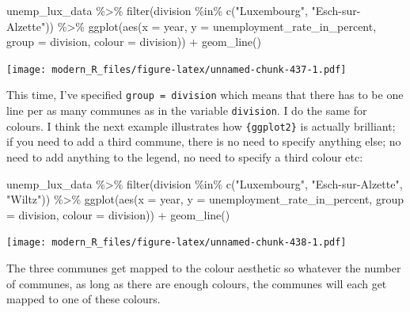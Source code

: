 \documentclass[
]{article}
\newenvironment{Shaded}{\begin{snugshade}}{\end{snugshade}}
\newcommand{\AttributeTok}[1]{\textcolor[rgb]{0.77,0.63,0.00}{#1}}
\newcommand{\FunctionTok}[1]{\textcolor[rgb]{0.00,0.00,0.00}{#1}}
\newcommand{\NormalTok}[1]{#1}
\newcommand{\SpecialCharTok}[1]{\textcolor[rgb]{0.00,0.00,0.00}{#1}}
\newcommand{\StringTok}[1]{\textcolor[rgb]{0.31,0.60,0.02}{#1}}
\begin{document}
\begin{Shaded}
\begin{Highlighting}[]
\NormalTok{unemp\_lux\_data }\SpecialCharTok{\%\textgreater{}\%}
  \FunctionTok{filter}\NormalTok{(division }\SpecialCharTok{\%in\%} \FunctionTok{c}\NormalTok{(}\StringTok{"Luxembourg"}\NormalTok{, }\StringTok{"Esch{-}sur{-}Alzette"}\NormalTok{)) }\SpecialCharTok{\%\textgreater{}\%}
  \FunctionTok{ggplot}\NormalTok{(}\FunctionTok{aes}\NormalTok{(}\AttributeTok{x =}\NormalTok{ year, }\AttributeTok{y =}\NormalTok{ unemployment\_rate\_in\_percent, }\AttributeTok{group =}\NormalTok{ division, }\AttributeTok{colour =}\NormalTok{ division)) }\SpecialCharTok{+}
  \FunctionTok{geom\_line}\NormalTok{()}
\end{Highlighting}
\end{Shaded}

\texttt{[image: modern\_R\_files/figure-latex/unnamed-chunk-437-1.pdf]}

This time, I've specified \texttt{group\ =\ division} which means that there has to be one line per as many
communes as in the variable \texttt{division}. I do the same for colours. I think the next example
illustrates how \texttt{\{ggplot2\}} is actually brilliant; if you need to add a third commune, there is no
need to specify anything else; no need to add anything to the legend, no need to specify a third
colour etc:

\begin{Shaded}
\begin{Highlighting}[]
\NormalTok{unemp\_lux\_data }\SpecialCharTok{\%\textgreater{}\%}
  \FunctionTok{filter}\NormalTok{(division }\SpecialCharTok{\%in\%} \FunctionTok{c}\NormalTok{(}\StringTok{"Luxembourg"}\NormalTok{, }\StringTok{"Esch{-}sur{-}Alzette"}\NormalTok{, }\StringTok{"Wiltz"}\NormalTok{)) }\SpecialCharTok{\%\textgreater{}\%}
  \FunctionTok{ggplot}\NormalTok{(}\FunctionTok{aes}\NormalTok{(}\AttributeTok{x =}\NormalTok{ year, }\AttributeTok{y =}\NormalTok{ unemployment\_rate\_in\_percent, }\AttributeTok{group =}\NormalTok{ division, }\AttributeTok{colour =}\NormalTok{ division)) }\SpecialCharTok{+}
  \FunctionTok{geom\_line}\NormalTok{()}
\end{Highlighting}
\end{Shaded}

\texttt{[image: modern\_R\_files/figure-latex/unnamed-chunk-438-1.pdf]}

The three communes get mapped to the colour aesthetic so whatever the number of communes, as long
as there are enough colours, the communes will each get mapped to one of these colours.
\end{document}
